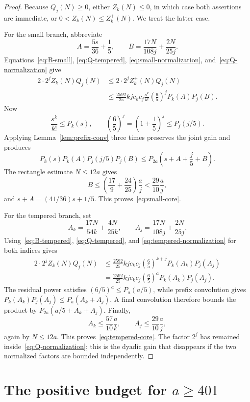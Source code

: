 \documentclass[11pt]{article}
\theoremstyle{definition}
\theoremstyle{remark}
\begin{document}
\begin{proof}
Because $Q_j(N)\ge0$, either $Z_k(N)\le0$, in which case both assertions are
immediate, or $0<Z_k(N)\le Z_k^+(N)$.  We treat the latter case.

For the small branch, abbreviate
\[
 A=\frac{5s}{36}+\frac15,
 \qquad
 B=\frac{17N}{108j}+\frac{2N}{25j}.
\]
Equations~\eqref{eq:B-small}, \eqref{eq:Q-tempered},
\eqref{eq:small-normalization}, and~\eqref{eq:Q-normalization} give
\begin{align*}
 2\cdot 2^j Z_k(N)Q_j(N)
 &\le 2\cdot 2^j Z_k^+(N)Q_j(N)\\
 &\le \frac{2592}{25}kjc_kc_j
      \frac{s^k}{k!}\left(\frac65\right)^jP_k(A)P_j(B).
\end{align*}
Now
\[
 \frac{s^k}{k!}\le P_k(s),
 \qquad
 \left(\frac65\right)^j
   =\left(1+\frac15\right)^j\le P_j(j/5).
\]
Applying Lemma~\ref{lem:prefix-conv} three times preserves the joint gain and
produces
\[
 P_k(s)P_k(A)P_j(j/5)P_j(B)
 \le P_{2a}\left(s+A+\frac j5+B\right).
\]
The rectangle estimate $N\le12a$ gives
\[
 B\le\left(\frac{17}{9}+\frac{24}{25}\right)\frac aj
   <\frac{29}{10}\frac aj,
\]
and $s+A=(41/36)s+1/5$.  This proves~\eqref{eq:small-core}.

For the tempered branch, set
\[
 A_k=\frac{17N}{54k}+\frac{4N}{25k},
 \qquad
 A_j=\frac{17N}{108j}+\frac{2N}{25j}.
\]
Using~\eqref{eq:B-tempered}, \eqref{eq:Q-tempered}, and
\eqref{eq:tempered-normalization} for both indices gives
\begin{align*}
 2\cdot 2^jZ_k(N)Q_j(N)
 &\le\frac{2592}{25}kjc_kc_j
       \left(\frac65\right)^{k+j}P_k(A_k)P_j(A_j)\\
 &=\frac{2592}{25}kjc_kc_j
       \left(\frac65\right)^aP_k(A_k)P_j(A_j).
\end{align*}
The residual power satisfies $(6/5)^a\le P_a(a/5)$, while prefix convolution
gives $P_k(A_k)P_j(A_j)\le P_a(A_k+A_j)$.  A final convolution therefore
bounds the product by $P_{2a}(a/5+A_k+A_j)$.  Finally,
\[
 A_k\le\frac{57}{10}\frac ak,
 \qquad
 A_j\le\frac{29}{10}\frac aj,
\]
again by $N\le12a$.  This proves~\eqref{eq:tempered-core}.  The factor
$2^j$ has remained inside~\eqref{eq:Q-normalization}; this is the dyadic gain
that disappears if the two normalized factors are bounded independently.
\end{proof}

\section{The positive budget for \texorpdfstring{$a\ge401$}{a>=401}}
\label{sec:positive}
\end{document}
